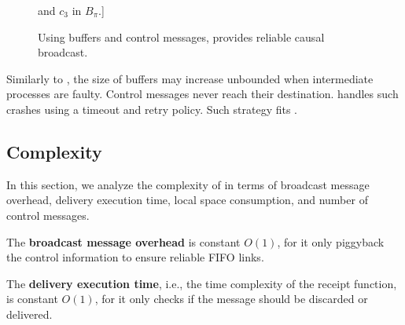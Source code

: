 \begin{figure*}
\begin{center}
    and $c_3$ in $B_\pi$.]
    {}
    \hspace{10pt}
    \hspace{10pt}
    \\
    \caption{\label{fig:solve}Using buffers and control messages, \RPCBROADCAST 
      provides reliable causal broadcast.}
  \end{center}
\end{figure*}



Similarly to \PCBROADCAST, the size of buffers may increase unbounded when
intermediate processes are faulty. Control messages never reach their
destination. \PCBROADCAST handles such crashes using a timeout and retry
policy. Such strategy fits \RPCBROADCAST.  


\subsection{Complexity}
\label{subsec:complexity}

In this section, we analyze the complexity of \RPCBROADCAST in terms of
broadcast message overhead, delivery execution time, local space consumption,
and number of control messages. 

\noindent The \textbf{broadcast message overhead} is constant $O(1)$, for it
only piggyback the control information to ensure reliable FIFO links.

\noindent The \textbf{delivery execution time}, i.e., the time complexity of the
receipt function, is constant $O(1)$, for it only checks if the message should
be discarded or delivered. 

